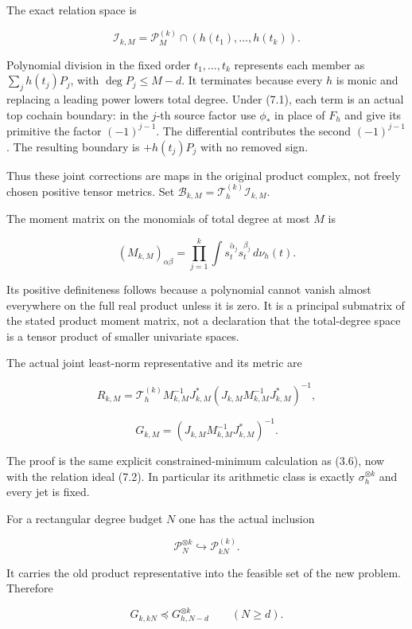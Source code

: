 \documentclass[
]{article}
\begin{document}
The exact relation space is

\[\mathcal I_{k,M}=\mathcal P_M^{(k)}\cap(h(t_1),\ldots,h(t_k)).\tag{7.2}\]

Polynomial division in the fixed order \(t_1,\ldots,t_k\) represents
each member as \(\sum_j h(t_j)P_j\), with \(\deg P_j\le M-d\). It
terminates because every \(h\) is monic and replacing a leading power
lowers total degree. Under (7.1), each term is an actual top cochain
boundary: in the \(j\)-th source factor use \(\phi_*\) in place of
\(F_h\) and give its primitive the factor \((-1)^{j-1}\). The
differential contributes the second \((-1)^{j-1}\). The resulting
boundary is \(+h(t_j)P_j\) with no removed sign.

Thus these joint corrections are maps in the original product complex,
not freely chosen positive tensor metrics. Set
\(\mathcal B_{k,M}=\mathcal T_h^{(k)}\mathcal I_{k,M}\).

The moment matrix on the monomials of total degree at most \(M\) is

\[\boxed{(M_{k,M})_{\alpha\beta}=\prod_{j=1}^k\int\overline{s_t^{\alpha_j}}s_t^{\beta_j}\,d\nu_h(t).}\tag{7.3}\]

Its positive definiteness follows because a polynomial cannot vanish
almost everywhere on the full real product unless it is zero. It is a
principal submatrix of the stated product moment matrix, not a
declaration that the total-degree space is a tensor product of smaller
univariate spaces.

The actual joint least-norm representative and its metric are

\[\boxed{R_{k,M}=\mathcal T_h^{(k)}M_{k,M}^{-1}J_{k,M}^*
(J_{k,M}M_{k,M}^{-1}J_{k,M}^*)^{-1},}\]

\[\boxed{G_{k,M}=(J_{k,M}M_{k,M}^{-1}J_{k,M}^*)^{-1}.}\tag{7.4}\]

The proof is the same explicit constrained-minimum calculation as (3.6),
now with the relation ideal (7.2). In particular its arithmetic class is
exactly \(\sigma_h^{\otimes k}\) and every jet is fixed.

For a rectangular degree budget \(N\) one has the actual inclusion

\[\mathcal P_N^{\otimes k}\hookrightarrow\mathcal P_{kN}^{(k)}.\]

It carries the old product representative into the feasible set of the
new problem. Therefore

\[G_{k,kN}\preceq G_{h,N-d}^{\otimes k}\qquad(N\ge d).\tag{7.5}\]
\end{document}
